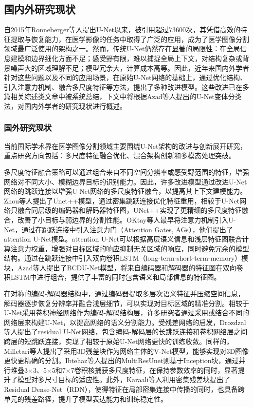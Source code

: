 \subsection{国内外研究现状}

自2015年Ronneberger等人提出U-Net以来，被引用超过73600次，其凭借高效的特征提取与恢复能力，在医学影像的任务中取得了广泛的应用，成为了医学图像分割领域最广泛使用的架构之一。然而，传统U-Net仍然存在显著的局限性：在全局信息建模和边界细化方面不足；感受野有限，难以捕捉全局上下文，对结构复杂或背景噪声大的区域理解不足；模型冗余大，计算成本高等。因此，近年来国内外学者针对这些问题以及不同的应用场景，在原始U-Net网络的基础上，通过优化结构、引入注意力机制、融合多尺度特征等方法，提出了多种改进模型。这些改进已在多篇相关综述类文章中被系统总结\cite{azad2024,krithikaaliasanbudevi2022,wang2023}，下文中将根据Azad等人提出的U-Net变体分类法\cite{azad2024}，对国内外学者的研究现状进行概述。

\subsubsection{国外研究现状}

当前国际学术界在医学图像分割领域主要围绕U-Net架构的改进与创新展开研究，重点研究方向包括：多尺度特征融合优化、混合架构创新和多模态处理突破。

多尺度特征融合策略可以通过组合来自不同空间分辨率或感受野范围的特征，增强网络对不同大小、模糊边界目标的识别能力。因此，许多改进模型通过改进U-Net网络的跳跃连接以增强U-Net网络的多尺度特征融合，以提高其上下文建模能力。Zhou等人\cite{zhou2018}提出了Unet++模型，通过密集跳跃连接优化特征重用，相较于U-Net网络只融合同层级的编码器和解码器特征图，UNet++实现了更精细的多尺度特征融合，改善了小目标与弱边界的分割性能。OKtay等人\cite{oktay2018}最早将注意力机制引入U-Net，通过在跳跃连接中引入注意力门（Attention Gates, AGs），他们提出了attention U-Net模型。attention U-Net可以根据高层语义信息和浅层特征图联合计算注意力权重，增强对目标区域的响应抑制无关区域的响应，同时避免冗余的模型结构。通过在跳跃连接中引入双向卷积LSTM（long-term-short-term-memory）模块，Azad等人\cite{azad2019}提出了BCDU-Net模型，将来自编码器和解码器的特征图在双向卷积LSTM中进行组合，提供了丰富的同时包含语义和局部信息的特征图。

在对称的编码-解码器结构中，通过编码器提取多层次语义特征并压缩空间信息，解码器逐步恢复分辨率并融合浅层细节，可以实现对目标区域的精准分割。相较于U-Net采用卷积神经网络作为编码-解码结构层，许多研究者通过采用或结合不同的网络层来构建U-Net，以提高网络的语义分割能力。受残差网络的启发，Drozdzal等人\cite{drozdzal2016}提出了residual U-Net网络，包含编码-解码层的长跳跃连接和卷积网络层之间跨层的短跳跃连接，实现了相较于原始U-Net网络更快的训练收敛。同样的，Milletari等人\cite{milletari2016}提出了采用3D残差块作为网络主体的V-Net模型，能够实现对3D图像更快更精确的分割。Ibtehaz等人\cite{ibtehaz2020}提出的MultiResUnet则基于Inception块，通过并行堆叠3×3、5×5和7×7卷积核捕获多尺度特征，在保持参数效率的同时，显著提升了模型对多尺寸目标的适应性。此外，Karaali等人\cite{karaali2022}利用密集残差块提出了Residual Dense-Net（RDN），使得特征在局部密集连接中传播的同时，也具备跨单元的残差路径，提升了模型表达能力和训练稳定性。

